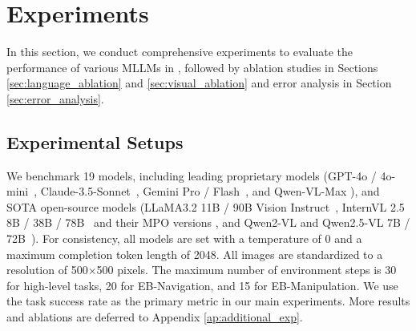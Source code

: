 

\section{Experiments}



In this section, we conduct comprehensive experiments to evaluate the performance of various MLLMs in \name, followed by ablation studies in Sections \ref{sec:language_ablation} and \ref{sec:visual_ablation} and error analysis in Section \ref{sec:error_analysis}.

\vspace{-5pt}
\subsection{Experimental Setups}
\vspace{-5pt}


We benchmark 19 models, including leading proprietary models (GPT-4o / 4o-mini~\cite{GPT-4o,GPT-4o-mini}, Claude-3.5-Sonnet~\cite{Claude-3.5-Sonnet}, Gemini Pro / Flash~\cite{team2023gemini,team2024gemini,Gemini2.0}, and Qwen-VL-Max \cite{bai2023qwen}), and SOTA open-source models (LLaMA3.2 11B / 90B Vision Instruct~\cite{llama3.2}, InternVL 2.5 8B / 38B / 78B~\cite{internvl2.5} and their MPO versions \cite{wang2024enhancing}, and Qwen2-VL and Qwen2.5-VL 7B / 72B~\cite{wang2024qwen2,bai2025qwen25vl}). For consistency, all models are set with a temperature of 0 and a maximum completion token length of 2048. All images are standardized to a resolution of 500$\times$500 pixels. The maximum number of environment steps is 30 for high-level tasks, 20 for EB-Navigation, and 15 for EB-Manipulation. We use the task success rate as the primary metric in our main experiments. More results and ablations are deferred to Appendix \ref{ap:additional_exp}.

